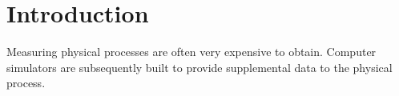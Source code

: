 \section{Introduction}

Measuring physical processes are often very expensive to obtain. Computer simulators are subsequently built to provide supplemental data to the physical process.
